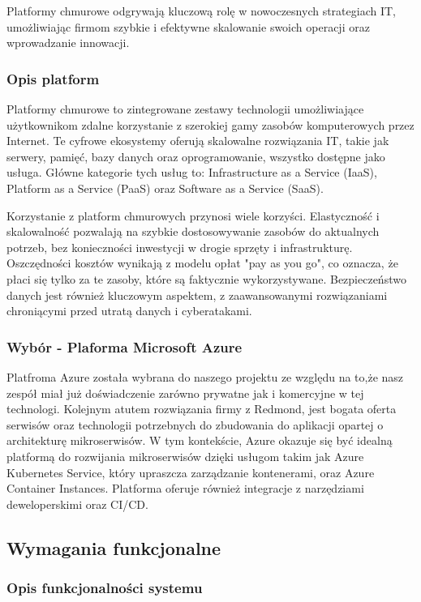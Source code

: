 Platformy chmurowe odgrywają kluczową rolę w nowoczesnych strategiach IT, umożliwiając firmom szybkie i efektywne skalowanie swoich operacji oraz wprowadzanie innowacji.
\subsubsection{Opis platform}
Platformy chmurowe to zintegrowane zestawy technologii umożliwiające użytkownikom zdalne korzystanie z szerokiej gamy zasobów komputerowych przez Internet. Te cyfrowe ekosystemy oferują skalowalne rozwiązania IT, takie jak serwery, pamięć, bazy danych oraz oprogramowanie, wszystko dostępne jako usługa. Główne kategorie tych usług to: Infrastructure as a Service (IaaS), Platform as a Service (PaaS) oraz Software as a Service (SaaS).

Korzystanie z platform chmurowych przynosi wiele korzyści. Elastyczność i skalowalność pozwalają na szybkie dostosowywanie zasobów do aktualnych potrzeb, bez konieczności inwestycji w drogie sprzęty i infrastrukturę. Oszczędności kosztów wynikają z modelu opłat "pay as you go", co oznacza, że płaci się tylko za te zasoby, które są faktycznie wykorzystywane. Bezpieczeństwo danych jest również kluczowym aspektem, z zaawansowanymi rozwiązaniami chroniącymi przed utratą danych i cyberatakami.
\subsubsection{Wybór - Plaforma Microsoft Azure}
\clearpage
Platfroma Azure została wybrana do naszego projektu ze względu na to,że nasz zespół miał już doświadczenie zarówno prywatne jak i komercyjne w tej technologi. Kolejnym atutem rozwiązania firmy z Redmond, jest bogata oferta serwisów oraz technologii potrzebnych do zbudowania do aplikacji opartej o architekturę mikroserwisów.
W tym kontekście, Azure okazuje się być idealną platformą do rozwijania mikroserwisów dzięki usługom takim jak Azure Kubernetes Service, który upraszcza zarządzanie kontenerami, oraz Azure Container Instances. Platforma oferuje również integracje z narzędziami deweloperskimi oraz CI/CD.

\subsection{Wymagania funkcjonalne}

\subsubsection{Opis funkcjonalności systemu}

